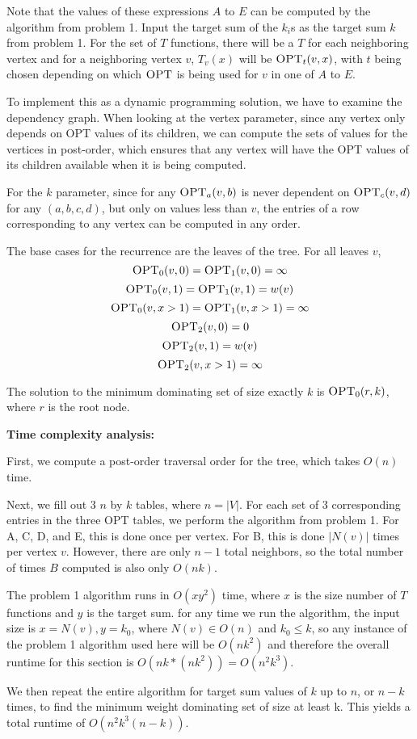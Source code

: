 \documentclass[11pt]{article}
\begin{document}
\begin{solution}
Note that the values of these expressions $A$ to $E$ can be computed by the
algorithm from problem 1. Input the target sum of the $k_i$s as the target sum
$k$ from problem 1. For the set of $T$ functions, there will be a $T$ for each
neighboring vertex and for a neighboring vertex $v$, $T_v(x)$ will be
$\textsc{OPT}_t(v, x)$, with $t$ being chosen depending on which
$\textsc{OPT}$ is being used for $v$ in one of $A$ to $E$.

To implement this as a dynamic programming solution, we have to examine the
dependency graph. When looking at the vertex parameter, since any vertex only
depends on \textsc{OPT} values of its children, we can compute the
sets of values for the vertices in post-order, which ensures that any vertex
will have the \textsc{OPT} values of its children available when it is being
computed.

For the $k$ parameter, since for any $\textsc{OPT}_a(v,b)$ is never dependent
on $\textsc{OPT}_c(v,d)$ for any $(a,b,c,d)$, but only on values less than
$v$, the entries of a row corresponding to any vertex can be computed in any
order. 

The base cases for the recurrence are the leaves of the tree. For all leaves
$v$,
$$\textsc{OPT}_0(v,0) = \textsc{OPT}_1(v,0) = \infty$$
$$\textsc{OPT}_0(v,1) = \textsc{OPT}_1(v,1) = w(v)$$
$$\textsc{OPT}_0(v,x > 1) = \textsc{OPT}_1(v, x > 1) = \infty$$
$$\textsc{OPT}_2(v,0) = 0$$
$$\textsc{OPT}_2(v,1) = w(v)$$
$$\textsc{OPT}_2(v, x > 1) = \infty$$


The solution to the minimum dominating set of size exactly $k$ is
$\textsc{OPT}_0(r,k)$, where $r$ is the root node.

\textbf{Time complexity analysis:}

First, we compute a post-order traversal order for the tree, which takes
$O(n)$ time. 

Next, we fill out 3 $n$ by $k$ tables, where $n = |V|$. For each set of 3
corresponding entries in the three \textsc{OPT} tables, we perform the
algorithm from problem 1. For A, C, D, and E, this is done once per vertex. For B, this is done $|N(v)|$
times per vertex $v$. However, there are only $n-1$ total neighbors, so the
total number of times $B$ computed is also only $O(nk)$.

The problem 1 algorithm runs in $O(xy^2)$ time, where $x$ is the size number
of $T$ functions and $y$ is the target sum. for any time we run the algorithm,
the input size is $x = N(v), y = k_0$, where $N(v) \in O(n)$ and $k_0 \leq k$,
so any instance of the problem 1 algorithm used here will be $O(nk^2)$ and
therefore the overall runtime for this section is $O(nk*(nk^2)) = O(n^2k^3)$.

We then repeat the entire algorithm for target sum values of
$k$ up to $n$, or $n - k$ times, to find the minimum weight dominating set of size at least k.
This yields a total runtime of $O(n^2k^3(n-k))$.

\end{solution}
\end{document}
